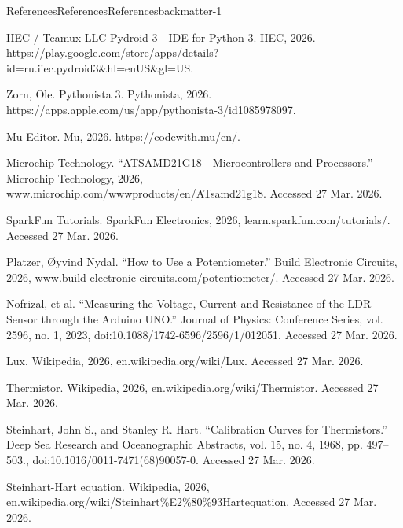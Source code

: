 \documentclass[oneside,10pt,]{book}
\numberwithin{equation}{section}
\begin{document}
\begin{references-chapter-numberless}{References}{References}{}{References}{}{}{backmatter-1}
\begin{referencelist}
\hypertarget{pydroid}{}IIEC \slash{} Teamux LLC Pydroid 3 - IDE for Python 3. IIEC, 2026. https:\slash{}\slash{}play.google.com\slash{}store\slash{}apps\slash{}details?id=ru.iiec.pydroid3\&hl=en\textunderscore{}US\&gl=US.%

\hypertarget{pythonista}{}Zorn, Ole. Pythonista 3. Pythonista, 2026. https:\slash{}\slash{}apps.apple.com\slash{}us\slash{}app\slash{}pythonista-3\slash{}id1085978097.%

\hypertarget{mu}{}Mu Editor. Mu, 2026. https:\slash{}\slash{}codewith.mu\slash{}en\slash{}.%

\hypertarget{CPXchip}{}Microchip Technology. “ATSAMD21G18 - Microcontrollers and Processors.” Microchip Technology, 2026, www.microchip.com\slash{}wwwproducts\slash{}en\slash{}ATsamd21g18. Accessed 27 Mar. 2026.%

\hypertarget{sparkfun}{}SparkFun Tutorials. SparkFun Electronics, 2026, learn.sparkfun.com\slash{}tutorials\slash{}. Accessed 27 Mar. 2026.%

\hypertarget{potentiometerlearn}{}Platzer, Øyvind Nydal. “How to Use a Potentiometer.” Build Electronic Circuits, 2026, www.build-electronic-circuits.com\slash{}potentiometer\slash{}. Accessed 27 Mar. 2026.%

\hypertarget{lux}{}Nofrizal, et al. “Measuring the Voltage, Current and Resistance of the LDR Sensor through the Arduino UNO.” Journal of Physics: Conference Series, vol. 2596, no. 1, 2023, doi:10.1088\slash{}1742-6596\slash{}2596\slash{}1\slash{}012051. Accessed 27 Mar. 2026.%

\hypertarget{lux-wikipedia}{}Lux. Wikipedia, 2026, en.wikipedia.org\slash{}wiki\slash{}Lux. Accessed 27 Mar. 2026.%

\hypertarget{thermistor-wikipedia}{}Thermistor. Wikipedia, 2026, en.wikipedia.org\slash{}wiki\slash{}Thermistor. Accessed 27 Mar. 2026.%

\hypertarget{stein-hart}{}Steinhart, John S., and Stanley R. Hart. “Calibration Curves for Thermistors.” Deep Sea Research and Oceanographic Abstracts, vol. 15, no. 4, 1968, pp. 497–503., doi:10.1016\slash{}0011-7471(68)90057-0. Accessed 27 Mar. 2026.%

\hypertarget{steinhart-wikipedia}{}Steinhart-Hart equation. Wikipedia, 2026, en.wikipedia.org\slash{}wiki\slash{}Steinhart\%E2\%80\%93Hart\textunderscore{}equation. Accessed 27 Mar. 2026.%


\end{referencelist}
\end{references-chapter-numberless}
\end{document}
